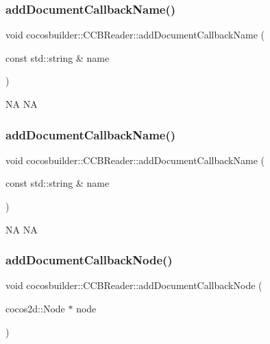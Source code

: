\subsubsection{\texorpdfstring{add\+Document\+Callback\+Name()}{addDocumentCallbackName()}\hspace{0.1cm}{\footnotesize\ttfamily [1/2]}}
{\footnotesize\ttfamily void cocosbuilder\+::\+C\+C\+B\+Reader\+::add\+Document\+Callback\+Name (\begin{DoxyParamCaption}\item[{const std\+::string \&}]{name }\end{DoxyParamCaption})}

NA  NA \mbox{\label{classcocosbuilder_1_1CCBReader_a30939fd9e92943e77b15d3649ab98e15}} 
\subsubsection{\texorpdfstring{add\+Document\+Callback\+Name()}{addDocumentCallbackName()}\hspace{0.1cm}{\footnotesize\ttfamily [2/2]}}
{\footnotesize\ttfamily void cocosbuilder\+::\+C\+C\+B\+Reader\+::add\+Document\+Callback\+Name (\begin{DoxyParamCaption}\item[{const std\+::string \&}]{name }\end{DoxyParamCaption})}

NA  NA \mbox{\label{classcocosbuilder_1_1CCBReader_ae7a7339510cc15950f11abdba201b7f9}} 
\subsubsection{\texorpdfstring{add\+Document\+Callback\+Node()}{addDocumentCallbackNode()}\hspace{0.1cm}{\footnotesize\ttfamily [1/2]}}
{\footnotesize\ttfamily void cocosbuilder\+::\+C\+C\+B\+Reader\+::add\+Document\+Callback\+Node (\begin{DoxyParamCaption}\item[{cocos2d\+::\+Node $\ast$}]{node }\end{DoxyParamCaption})}

